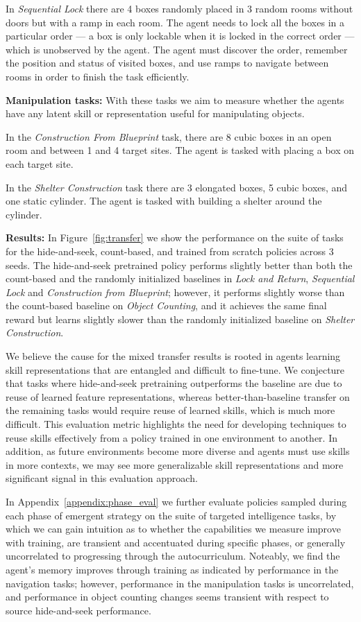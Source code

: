 In \emph{Sequential Lock} there are 4 boxes randomly placed in 3 random rooms without doors but with a ramp in each room. 
The agent needs to lock all the boxes in a particular order --- a box is only lockable when it is locked in the correct order --- which is unobserved by the agent. 
The agent must discover the order, remember the position and status of visited boxes, and use ramps to navigate between rooms in order to finish the task efficiently.

\textbf{Manipulation tasks:}
With these tasks we aim to measure whether the agents have any latent skill or representation useful for manipulating objects.

In the \emph{Construction From Blueprint} task, there are 8 cubic boxes in an open room and between 1 and 4 target sites.
The agent is tasked with placing a box on each target site.

In the \emph{Shelter Construction} task there are 3 elongated boxes, 5 cubic boxes, and one static cylinder. The agent is tasked with building a shelter around the cylinder.


\textbf{Results:}
In Figure~\ref{fig:transfer} we show the performance on the suite of tasks for the hide-and-seek, count-based, and trained from scratch policies across 3 seeds.
The hide-and-seek pretrained policy performs slightly better than both the count-based and the randomly initialized baselines in \emph{Lock and Return}, \emph{Sequential Lock} and \emph{Construction from Blueprint}; however, it performs slightly worse than the count-based baseline on \emph{Object Counting}, and it achieves the same final reward but learns slightly slower than the randomly initialized baseline on \emph{Shelter Construction}.

We believe the cause for the mixed transfer results is rooted in agents learning skill representations that are entangled and difficult to fine-tune. We conjecture that tasks where hide-and-seek pretraining outperforms the baseline are due to reuse of learned feature representations, whereas better-than-baseline transfer on the remaining tasks would require reuse of learned skills, which is much more difficult. This evaluation metric highlights the need for developing techniques to reuse skills effectively from a policy trained in one environment to another. In addition, as future environments become more diverse and agents must use skills in more contexts, we may see more generalizable skill representations and more significant signal in this evaluation approach.

In Appendix~\ref{appendix:phase_eval} we further evaluate policies sampled during each phase of emergent strategy on the suite of targeted intelligence tasks, by which we can gain intuition as to whether the capabilities we measure improve with training, are transient and accentuated during specific phases, or generally uncorrelated to progressing through the autocurriculum. Noteably, we find the agent's memory improves through training as indicated by performance in the navigation tasks; however, performance in the manipulation tasks is uncorrelated, and performance in object counting changes seems transient with respect to source hide-and-seek performance.